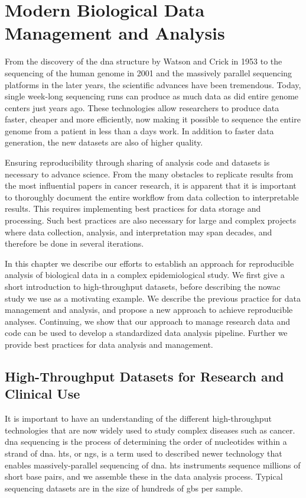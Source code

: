 \chapter{Modern Biological Data Management and Analysis}\label{biodata}
From the discovery of the \gls{dna} structure by Watson and Crick in
1953\cite{watson1953molecular} to the sequencing of the human genome in 2001
\cite{venter2001sequence,international2001initial} and the massively parallel
sequencing platforms in the later years\cite{metzker2010sequencing}, the
scientific advances have been tremendous. Today, single week-long sequencing
runs can produce as much data as did entire genome centers just years
ago.\cite{kahn2011future}  These technologies allow researchers to produce data
faster, cheaper and more efficiently, now making it possible to sequence the
entire genome from a patient in less than a days work. In addition to faster
data generation, the new datasets are also of higher quality.

Ensuring reproducibility through sharing of analysis code and datasets is
necessary to advance science.\cite{baker2016scientists} From the many obstacles
to replicate results from the most influential papers in cancer
research\cite{reprod}, it is apparent that it is important to thoroughly
document the entire workflow from data collection to interpretable results.
This requires implementing best practices for data storage and processing. Such
best practices are also necessary for large and complex projects where data
collection, analysis, and interpretation may span decades, and therefore be done
in several iterations. 

In this chapter we describe our efforts to establish an approach for
reproducible analysis of biological data in a complex epidemiological study. We
first give a short introduction to high-throughput datasets, before describing
the \gls{nowac} study we use as a motivating example. We describe the previous
practice for data management and analysis, and propose a new approach to
achieve reproducible analyses. Continuing, we show that our approach to manage
research data and code can be used to develop a standardized data analysis
pipeline. Further we provide best practices for data analysis and management. 


\section{High-Throughput Datasets for Research and Clinical Use} 
It is important to have an understanding of the different high-throughput
technologies that are now widely used to study complex diseases such as cancer. 
\gls{dna} sequencing is the process of determining the order of nucleotides
within a strand of \gls{dna}. \gls{hts}, or \gls{ngs}, is a term used to
described newer technology that enables massively-parallel sequencing of
\gls{dna}. \gls{hts} instruments sequence millions of short base pairs, and
we assemble these in the data analysis process. Typical sequencing datasets are
in the size of hundreds of \glspl{gb} per sample. 

